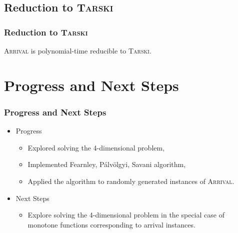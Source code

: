 \documentclass{beamer}
\begin{document}
\subsection{Reduction to \textsc{Tarski}}
\begin{frame}
\frametitle{Reduction to \textsc{Tarski}}
    \begin{Theorem}
        \textsc{Arrival} is polynomial-time reducible to \textsc{Tarski}.
    \end{Theorem}
\end{frame}


\newcommand{\pav}{Pálvölgyi}
\section{Progress and Next Steps}
\begin{frame}
\frametitle{Progress and Next Steps}
    \begin{itemize}
        \item Progress
        \begin{itemize}
            \item Explored solving the 4-dimensional \trsk problem,
            \item Implemented Fearnley, \pav, Savani algorithm,
            \item Applied the algorithm to randomly generated instances of \textsc{Arrival}.
        \end{itemize}
        \item Next Steps
        \begin{itemize}
            \item Explore solving the 4-dimensional \trsk problem in the special case of monotone functions
            corresponding to arrival instances.
        \end{itemize}
    \end{itemize}
\end{frame}
\end{document}
